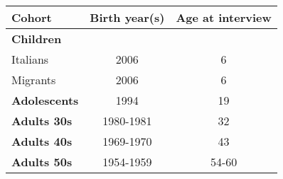\begin{tabular}{l c c}
\toprule
Cohort & Birth year(s) & Age at interview \\
\midrule
\textbf{Children} &  &    \\ 
\quad Italians & 2006 & 6 \\
\quad Migrants & 2006 & 6 \\
\textbf{Adolescents} & 1994 & 19  \\
\textbf{Adults 30s} & 1980-1981 & 32  \\
\textbf{Adults 40s} & 1969-1970 & 43  \\
\textbf{Adults 50s} & 1954-1959 & 54-60 \\
\bottomrule
\end{tabular}


